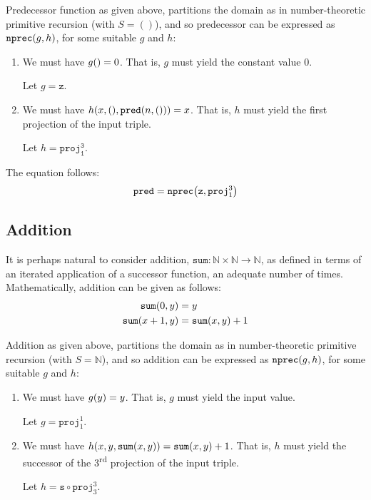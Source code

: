 Predecessor function as given above, partitions the domain as in
number-theoretic primitive recursion (with $S = ()$), and so predecessor can be
expressed as $\mathtt{nprec}{\mathopen{}\left({g,h}\right)\mathclose{}}$, for some suitable $g$ and $h$:

\begin{enumerate}[label=(\arabic*)]

\item We must have $g{\mathopen{}\left({}\right)\mathclose{}} = 0$. That is, $g$ must yield the constant value $0$.

Let  $g=\mathtt{z}$.

\item We must have $h{\mathopen{}\left({x,(),\mathtt{pred}{\mathopen{}\left({n,()}\right)\mathclose{}}}\right)\mathclose{}}=x$. That is, $h$ must yield
the first projection of the input triple.

Let $h = \mathtt{proj^3_1}$.

\end{enumerate}

The equation follows:\begin{align*}
%
\mathtt{pred} = \mathtt{nprec}\p{\mathtt{z}, \mathtt{proj}^3_1}
%
\end{align*}

\subsection{Addition}

It is perhaps natural to consider addition, $\mathtt{sum} : \mathbb{N} \times
\mathbb{N} \rightarrow \mathbb{N}$, as defined in terms of an iterated
application of a successor function, an adequate number of times.
Mathematically, addition can be given as follows:\begin{align*}
%
\mathtt{sum}\p{0, y} &= y \\
%
\mathtt{sum}\p{x+1, y} &= \mathtt{sum}\p{x,y} + 1 
%
\end{align*}

Addition as given above, partitions the domain as in number-theoretic primitive
recursion (with $S = \mathbb{N}$), and so addition can be expressed as
$\mathtt{nprec}{\mathopen{}\left({g,h}\right)\mathclose{}}$, for some suitable $g$ and $h$:

\begin{enumerate}[label=(\arabic*)]

\item We must have $g{\mathopen{}\left({y}\right)\mathclose{}} = y$. That is, $g$ must yield the input value.

Let $g = \mathtt{proj}^1_1$.

\item We must have $h{\mathopen{}\left({x,y,\mathtt{sum}{\mathopen{}\left({x,y}\right)\mathclose{}}}\right)\mathclose{}} = \mathtt{sum}{\mathopen{}\left({x,y}\right)\mathclose{}} + 1$.
That is, $h$ must yield the successor of the 3\textsuperscript{rd} projection
of the input triple.

Let $h = \mathtt{s} \circ \mathtt{proj}^3_3$.

\end{enumerate}

